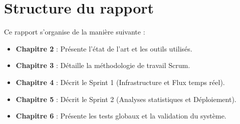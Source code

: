 \section{Structure du rapport}
Ce rapport s'organise de la manière suivante :
\begin{itemize}
  \item \textbf{Chapitre 2} : Présente l'état de l'art et les outils utilisés.
  \item \textbf{Chapitre 3} : Détaille la méthodologie de travail Scrum.
  \item \textbf{Chapitre 4} : Décrit le Sprint 1 (Infrastructure et Flux temps réel).
  \item \textbf{Chapitre 5} : Décrit le Sprint 2 (Analyses statistiques et Déploiement).
  \item \textbf{Chapitre 6} : Présente les tests globaux et la validation du système.
\end{itemize}
